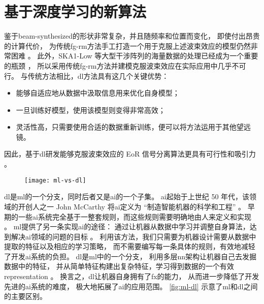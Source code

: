 \section{基于深度学习的新算法}

鉴于\ac{beam-synthesized}的形状非常复杂，并且随频率和位置而变化，
即使付出昂贵的计算代价，
为传统\ac{fg-rm}方法手工打造一个用于克服上述波束效应的模型仍然非常困难
\cite{lochner2015}。
此外，SKA1-Low 等大型干涉阵列的海量数据的处理已经成为一个重要的瓶颈
\cite{norris2011,dolensky2016,chrysostomou2018}，
所以采用传统\ac{fg-rm}方法并建模克服波束效应在实际应用中几乎不可行。
与传统方法相比，\ac{dl}方法具有这几个关键优势：
\begin{itemize}
  \item 能够自适应地从数据中汲取信息用来优化自身模型；
  \item 一旦训练好模型，使用该模型则变得非常高效；
  \item 灵活性高，只需要使用合适的数据重新训练，便可以将方法运用于其他望远镜。
\end{itemize}
因此，基于\ac{dl}研发能够克服波束效应的 EoR 信号分离算法更具有可行性和吸引力
\cite{herbel2018,vafaeiSadr2019}。

\begin{figure}[htp]
  \centering
  \texttt{[image: ml-vs-dl]}
  \label{fig:ml-dl}
\end{figure}

\ac{dl}是\ac{ml}的一个分支，同时后者又是\ac{ai}的一个子集。
\ac{ai}起始于上世纪 50 年代，该领域的开创人之一 John McCarthy 将\ac{ai}定义为
\enquote{制造智能机器的科学和工程} \cite{mcCarthy2007}。
早期的一些\ac{ai}系统完全基于一整套规则，而这些规则需要明确地由人来定义和实现
\cite{haugeland1985,jackson1998}。
\ac{ml}提供了另一条实现\ac{ai}的途径：
通过让机器从数据中学习并调整自身算法，达到解决\ac{ai}领域的问题的目标
\cite{samuel1959,mitchell1997}。
利用该方法，我们只需要为机器设计需要从数据中提取的特征以及相应的学习策略，
而不需要编写每一条具体的规则，有效地减轻了开发\ac{ai}系统的负担。
\ac{dl}是\ac{ml}中的一个分支，
利用多层\ac{nn}架构让机器自己去发掘数据中的特征，
并从简单特征构建出复杂特征，学习得到数据的一个有效\ac{representation}
\cite{bengio2013rl,schmidhuber2015,goodfellow2016}。
换言之，\ac{dl}让机器自身拥有了\ac{fx}的能力，
从而进一步降低了开发先进的\ac{ai}系统的难度，
极大地拓展了\ac{ai}的应用范围。
\autoref{fig:ml-dl} 示意了\ac{ml}和\ac{dl}之间的主要区别。

